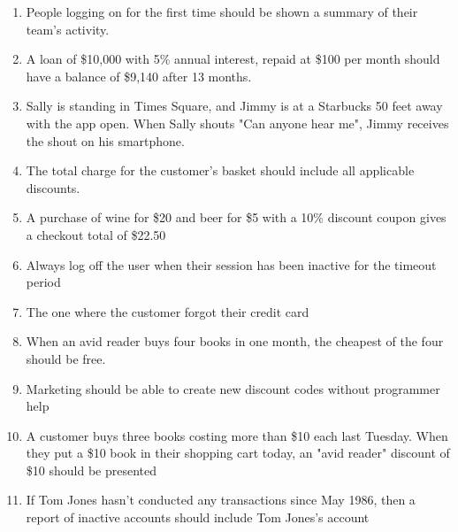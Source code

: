     \begin{enumerate}
        \item People logging on for the first time should be shown a summary of their team's activity.
        \item A loan of \$10,000 with 5\% annual interest, repaid at \$100 per month should have a balance of \$9,140 after 13 months.
        \item Sally is standing in Times Square, and Jimmy is at a Starbucks 50 feet away with the app open. When Sally shouts "Can anyone hear me", Jimmy receives the shout on his smartphone.
        \item The total charge for the customer's basket should include all applicable discounts.
        \item A purchase of wine for \$20 and beer for \$5 with a 10\% discount coupon gives a checkout total of \$22.50
        \item Always log off the user when their session has been inactive for the timeout period
        \item The one where the customer forgot their credit card
        \item When an avid reader buys four books in one month, the cheapest of the four should be free.
        \item Marketing should be able to create new discount codes without programmer help
        \item A customer buys three books costing more than \$10 each last Tuesday. When they put a \$10 book in their shopping cart today, an "avid reader" discount of \$10 should be presented
        \item If Tom Jones hasn't conducted any transactions since May 1986, then a report of inactive accounts should include Tom Jones's account
    \end{enumerate}
\fi
